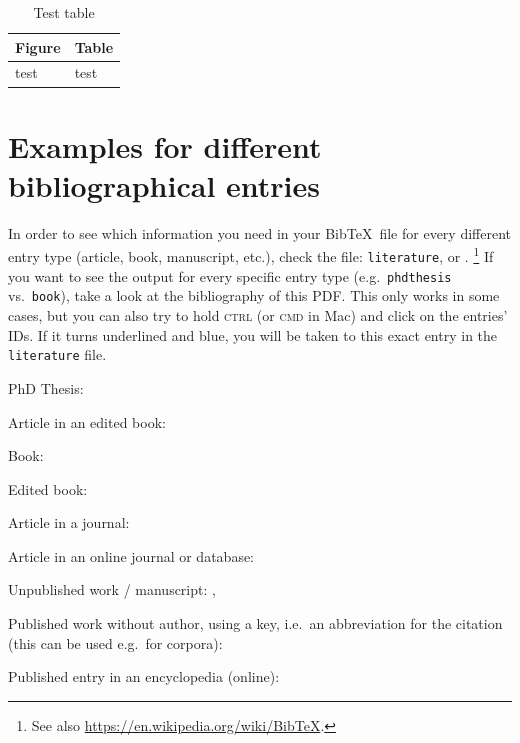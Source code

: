 \bigskip

\begin{table}[ht!]
	\centering
\begin{tabular}{l|l}
	Figure & Table \\
	\hline
	test & test \\
\end{tabular}
	\caption[Text table]{Test table}
\end{table}


\section{Examples for different bibliographical entries}
\label{ch:BibEntries}


In order to see which information you need in your Bib\TeX\ file for every different entry type (article, book, manuscript, etc.), check the file: \texttt{literature}, or \citet{Freitag&MyP15a}.%
	\footnote{See also \url{https://en.wikipedia.org/wiki/BibTeX}.} %
If you want to see the output for every specific entry type (e.g.\ \texttt{phdthesis} vs.\ \texttt{book}), take a look at the bibliography of this PDF. This only works in some cases, but you can also try to hold \textsc{ctrl} (or \textsc{cmd} in Mac) and click on the entries' IDs. If it turns underlined and blue, you will be taken to this exact entry in the \texttt{literature} file.


\begin{itemize*}
	\item PhD Thesis: \citet{Abney87a}
	
	\item Article in an edited book: \citet{Ackema15a}
	
	\item Book: \citet{Adger04a}
	
	\item Edited book: \citet{Kertesz&Co19a} %
	
	\item Article in a journal: \citet{Barwise&Co81a}
	
	\item Article in an online journal or database:
	\citet{Kolb&Co10a}
	
	\item Unpublished work / manuscript: \citet{LeipzigGloss15a}, \citet{MyP17c}
	
	\item Published work without author, using a key, i.e.\ an abbreviation for the citation (this can be used e.g.\ for corpora): \citep{DR17a}
	
	\item Published entry in an encyclopedia (online): \citet{MyP18b}
\end{itemize*}


